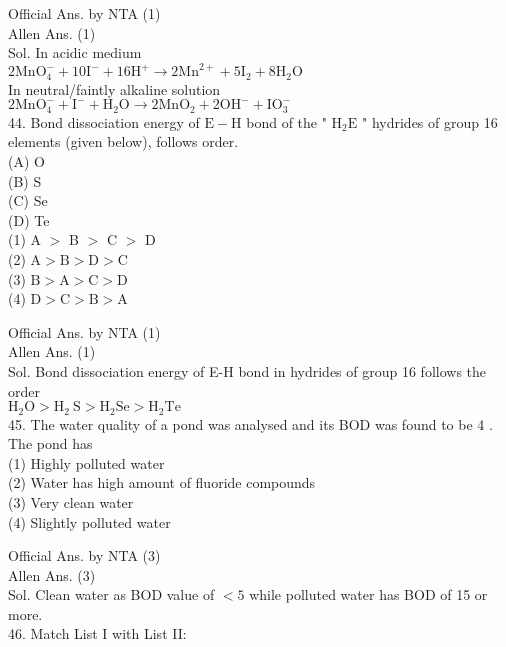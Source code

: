 \documentclass[10pt]{article}
\begin{document}
Official Ans. by NTA (1)\\
Allen Ans. (1)\\
Sol. In acidic medium\\
\(2 \mathrm{MnO}_{4}^{-}+10 \mathrm{I}^{-}+16 \mathrm{H}^{+} \rightarrow 2 \mathrm{Mn}^{2+}+5 \mathrm{I}_{2}+8 \mathrm{H}_{2} \mathrm{O}\)\\
In neutral/faintly alkaline solution\\
\(2 \mathrm{MnO}_{4}^{-}+\mathrm{I}^{-}+\mathrm{H}_{2} \mathrm{O} \rightarrow 2 \mathrm{MnO}_{2}+2 \mathrm{OH}^{-}+\mathrm{IO}_{3}^{-}\)\\
44. Bond dissociation energy of \(\mathrm{E}-\mathrm{H}\) bond of the " \(\mathrm{H}_{2} \mathrm{E}\) " hydrides of group 16 elements (given below), follows order.\\
(A) O\\
(B) S\\
(C) Se\\
(D) Te\\
(1) A \(>\) B \(>\) C \(>\) D\\
(2) \(\mathrm{A}>\mathrm{B}>\mathrm{D}>\mathrm{C}\)\\
(3) \(\mathrm{B}>\mathrm{A}>\mathrm{C}>\mathrm{D}\)\\
(4) \(\mathrm{D}>\mathrm{C}>\mathrm{B}>\mathrm{A}\)

Official Ans. by NTA (1)\\
Allen Ans. (1)\\
Sol. Bond dissociation energy of E-H bond in hydrides of group 16 follows the order\\
\(\mathrm{H}_{2} \mathrm{O}>\mathrm{H}_{2} \mathrm{~S}>\mathrm{H}_{2} \mathrm{Se}>\mathrm{H}_{2} \mathrm{Te}\)\\
45. The water quality of a pond was analysed and its BOD was found to be 4 . The pond has\\
(1) Highly polluted water\\
(2) Water has high amount of fluoride compounds\\
(3) Very clean water\\
(4) Slightly polluted water

Official Ans. by NTA (3)\\
Allen Ans. (3)\\
Sol. Clean water as BOD value of \(<5\) while polluted water has BOD of 15 or more.\\
46. Match List I with List II:
\end{document}
